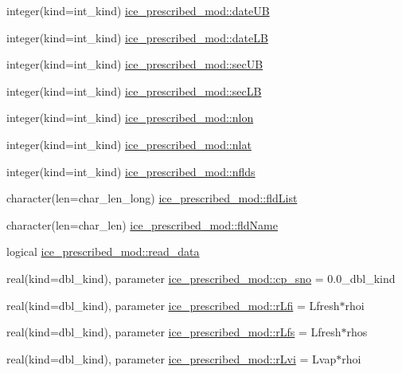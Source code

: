 \begin{DoxyCompactItemize}
\item 
integer(kind=int\_\-kind) \hyperlink{namespaceice__prescribed__mod_ad31a8b9239fb1c5cca528bc20733ba0a}{ice\_\-prescribed\_\-mod::dateUB}
\item 
integer(kind=int\_\-kind) \hyperlink{namespaceice__prescribed__mod_a43e79eec4249cc4e5883bebc24835c94}{ice\_\-prescribed\_\-mod::dateLB}
\item 
integer(kind=int\_\-kind) \hyperlink{namespaceice__prescribed__mod_a23c0dbac49b47681dc4939a3f8fd4100}{ice\_\-prescribed\_\-mod::secUB}
\item 
integer(kind=int\_\-kind) \hyperlink{namespaceice__prescribed__mod_a1b7b4c13bf3d78d72c62fe92a9a7ebcc}{ice\_\-prescribed\_\-mod::secLB}
\item 
integer(kind=int\_\-kind) \hyperlink{namespaceice__prescribed__mod_a7af5d49e5ab6fd7900aeb659387719a3}{ice\_\-prescribed\_\-mod::nlon}
\item 
integer(kind=int\_\-kind) \hyperlink{namespaceice__prescribed__mod_a553da06a37ff08c4047eaf0e66d4ec53}{ice\_\-prescribed\_\-mod::nlat}
\item 
integer(kind=int\_\-kind) \hyperlink{namespaceice__prescribed__mod_aeeaddf3904b52191dfe9e843ae36bcd0}{ice\_\-prescribed\_\-mod::nflds}
\item 
character(len=char\_\-len\_\-long) \hyperlink{namespaceice__prescribed__mod_a5bdbd6cc049323f35a5c8f6e4613c369}{ice\_\-prescribed\_\-mod::fldList}
\item 
character(len=char\_\-len) \hyperlink{namespaceice__prescribed__mod_a47d61c09a57e43eefae7895db766851a}{ice\_\-prescribed\_\-mod::fldName}
\item 
logical \hyperlink{namespaceice__prescribed__mod_a07b5b645c36b9f4e6ffecb44561d737e}{ice\_\-prescribed\_\-mod::read\_\-data}
\item 
real(kind=dbl\_\-kind), parameter \hyperlink{namespaceice__prescribed__mod_a9a106a2104e57fea97c1ddf91ffb9c0c}{ice\_\-prescribed\_\-mod::cp\_\-sno} = 0.0\_\-dbl\_\-kind
\item 
real(kind=dbl\_\-kind), parameter \hyperlink{namespaceice__prescribed__mod_a39606ec992e07a82b93638f009662c22}{ice\_\-prescribed\_\-mod::rLfi} = Lfresh$\ast$rhoi
\item 
real(kind=dbl\_\-kind), parameter \hyperlink{namespaceice__prescribed__mod_a6d6aa0ced82499b6a9e9fef93efc4215}{ice\_\-prescribed\_\-mod::rLfs} = Lfresh$\ast$rhos
\item 
real(kind=dbl\_\-kind), parameter \hyperlink{namespaceice__prescribed__mod_a142d1bc283475ba8d20f1f9693a7f0a7}{ice\_\-prescribed\_\-mod::rLvi} = Lvap$\ast$rhoi

\end{DoxyCompactItemize}
